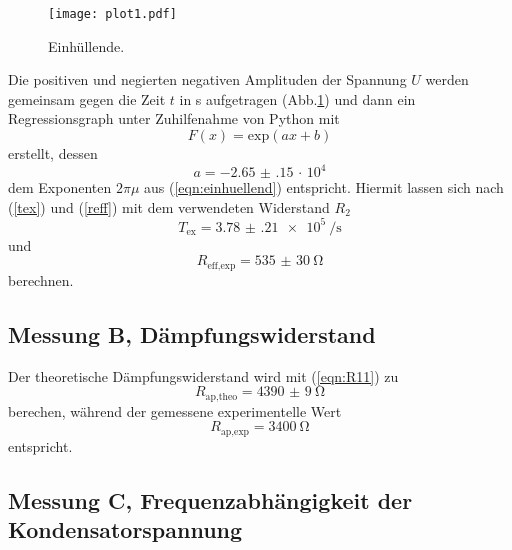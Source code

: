 \begin{figure}
  \centering
  \texttt{[image: plot1.pdf]}
  \caption{Einhüllende.}
  \label{fig:plot1}
\end{figure}
 Die positiven und negierten negativen Amplituden der Spannung $U$ werden gemeinsam
gegen die Zeit $t$ in s aufgetragen (Abb.\ref{fig:plot1}) und dann ein Regressionsgraph
unter Zuhilfenahme von Python mit
\begin{equation*}
   F(x) = \text{exp}(ax+b)
\end{equation*}
erstellt, dessen
\begin{equation*}
   a = \num{-2.65(15)}\, \cdot\, 10^{4}
\end{equation*}
dem Exponenten $2\pi\mu$ aus (\ref{eqn:einhuellend}) entspricht.
Hiermit lassen sich nach (\ref{tex}) und (\ref{reff}) mit dem verwendeten Widerstand $R_{\text{2}}$
\begin{equation*}
   T_{\text{ex}} = \SI{3.78(21)e5}{\per\second}
\end{equation*}
und
\begin{equation*}
R_{\text{eff,exp}} = \SI{535(30)}{\ohm}
\end{equation*}
berechnen.



\subsection{Messung B, Dämpfungswiderstand}
Der theoretische Dämpfungswiderstand wird mit (\ref{eqn:R11}) zu
\begin{equation*}
  R_{\text{ap,theo}} = \SI{4390(9)}{\ohm}
\end{equation*}
  berechen, während der gemessene experimentelle Wert
\begin{equation*}
  R_{\text{ap,exp}} = \SI{3400}{\ohm}
\end{equation*}
entspricht.

\subsection{Messung C, Frequenzabhängigkeit der Kondensatorspannung}

